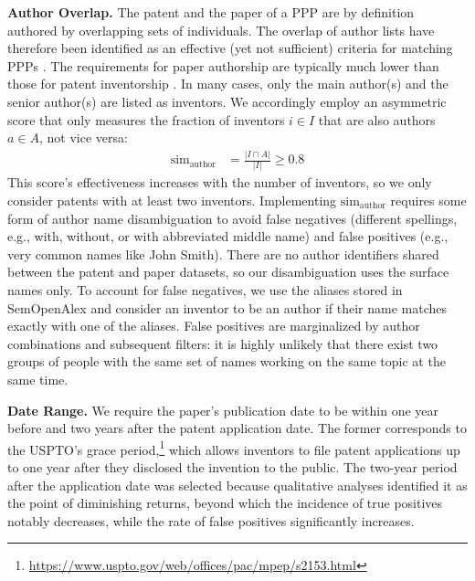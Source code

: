\noindent\textbf{Author Overlap. } The patent and the paper of a PPP are by definition authored by overlapping sets of individuals. The overlap of author lists have therefore been identified as an effective (yet not sufficient) criteria for matching PPPs \cite{magermanExploringFeasibilityAccuracy2010}.
The requirements for paper authorship are typically much lower than those for patent inventorship \cite{konskiInventorshipAuthorship2015}.
In many cases, only the main author(s) and the senior author(s) are listed as inventors.
We accordingly employ an asymmetric score that only measures the fraction of inventors $i \in I$ that are also authors $a \in A$, not vice versa:
\begin{align*}
  \text{sim}_\text{author} & = \frac{|I \cap A|}{|I|} \geq 0.8
\end{align*}
This score's effectiveness increases with the number of inventors, so we only consider patents with at least two inventors.
Implementing $\text{sim}_\text{author}$ requires some form of author name disambiguation to avoid false negatives (different spellings, e.g., with, without, or with abbreviated middle name) and false positives (e.g., very common names like John Smith).
There are no author identifiers shared between the patent and paper datasets, so our disambiguation uses the surface names only.
To account for false negatives, we use the aliases stored in SemOpenAlex and consider an inventor to be an author if their name matches exactly with one of the aliases.
False positives are marginalized by author combinations and subsequent filters: it is highly unlikely that there exist two groups of people with the same set of names working on the same topic at the same time.

\noindent\textbf{Date Range. } We require the paper's publication date to be within one year before and two years after the patent application date. The former corresponds to the USPTO's grace period,\footnote{\url{https://www.uspto.gov/web/offices/pac/mpep/s2153.html}} which allows inventors to file patent applications up to one year after they disclosed the invention to the public.
The two-year period after the application date was selected because qualitative analyses identified it as the point of diminishing returns, beyond which the incidence of true positives notably decreases, while the rate of false positives significantly increases.

